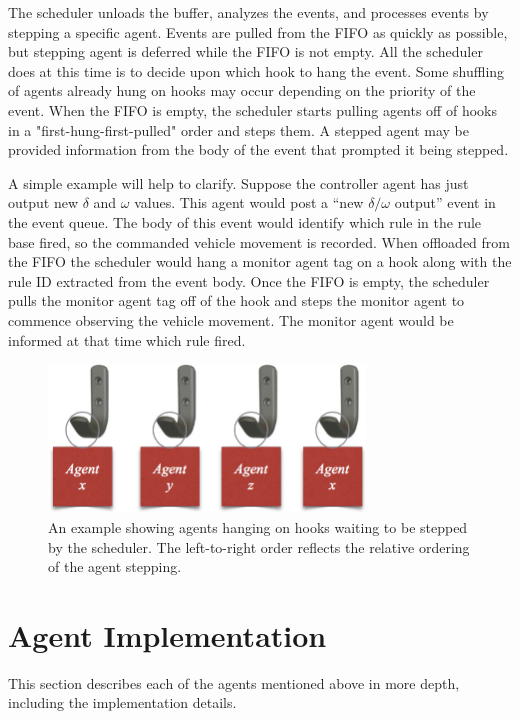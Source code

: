 The scheduler unloads the buffer, analyzes the events, and processes events by stepping a specific agent. Events are pulled from the FIFO as quickly as possible, but stepping agent is deferred while the FIFO is not empty. All the scheduler does at this time is to decide upon which hook to hang the event. Some shuffling of agents already hung on hooks may occur depending on the priority of the event. When the FIFO is empty, the scheduler starts pulling agents off of hooks in a "first-hung-first-pulled" order and steps them. A stepped agent may be provided information from the body of the event that prompted it being stepped.

A simple example will help to clarify. Suppose the controller agent has just output new $\delta$ and $\omega$ values. This agent would post a ``new $\delta / \omega$ output'' event in the event queue. The body of this event would identify which rule in the rule base fired, so the commanded vehicle movement is recorded. When offloaded from the FIFO the scheduler would hang a monitor agent tag on a hook along with the rule ID extracted from the event body. Once the FIFO is empty, the scheduler pulls the monitor agent tag off of the hook and steps the monitor agent to commence observing the vehicle movement. The monitor agent would be informed at that time which rule fired.

\begin{figure}
\centering
\includegraphics[width=0.75\textwidth]{Files/Figures/sch.png}
\caption[Agent scheduling example]{An example showing agents hanging on hooks waiting to be stepped by the scheduler. The left-to-right order reflects the relative ordering of the agent stepping.}
\label{fig:2}
\end{figure}


\section{Agent Implementation}
\label{sec-agentImplementation}
This section describes each of the agents mentioned above in more depth, including the implementation details.

